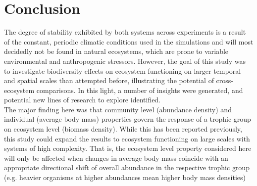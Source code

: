 \chapter{Conclusion}
The degree of stability exhibited by both systems across experiments is a result of the constant, periodic climatic conditions used in the simulations and will most decidedly not be found in natural ecosystems, which are prone to variable environmental and anthropogenic stressors. However, the goal of this study was to investigate biodiversity effects on ecosystem functioning on larger temporal and spatial scales than attempted before, illustrating the potential of cross-ecosystem comparisons. In this light, a number of insights were generated, and potential new lines of research to explore identified.\\
The major finding here was that 
community level (abundance density) and individual (average body mass) properties govern the response of a trophic group on ecosystem level (biomass density). While this has been reported previously, this study could expand the results to ecosystem functioning on large scales with systems of high complexity. 
That is, the ecosystem level property considered here will only be affected when changes in average body mass coincide with an appropriate directional shift of overall abundance in the respective trophic group (e.g. heavier organisms at higher abundances mean higher body mass densities)